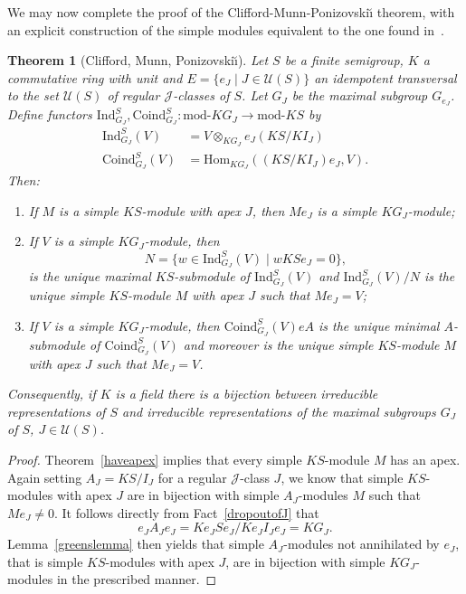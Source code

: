 \documentclass[reqno,11pt]{amsart}
\def\module#1{\mathrm{mod}\text{-}#1}
\def\J{\mathrel{{\mathscr J}}} %
\def\to{\rightarrow}
\def\Thmname{Theorem}
\newtheorem{Thm}{\Thmname}%
\numberwithin{equation}{section}
\begin{document}
We may now complete the proof of the Clifford-Munn-Ponizovski{\u\i} theorem,
with an explicit construction of the simple modules equivalent to the one
found in~\cite{RhodesZalc,LallePet}.

\begin{Thm}[Clifford, Munn, Ponizovski{\u\i}]
Let $S$ be a finite semigroup, $K$ a commutative ring with unit
and $E=\{e_J\mid
J\in \mathscr U(S)\}$ an idempotent transversal to the set $\mathscr
U(S)$ of regular
$\J$-classes of $S$.  Let $G_J$ be the maximal subgroup $G_{e_J}$.
Define functors $\mathrm{Ind}_{G_J}^S,\mathrm{Coind}_{G_J}^S:\module KG_J\to \module KS$ by
\begin{align*}
\mathrm{Ind}_{G_J}^S(V)&= V\otimes_{KG_J}e_J(KS/KI_J)\\
\mathrm{Coind}_{G_J}^S(V)&= \mathrm{Hom}_{KG_J}((KS/KI_J)e_J,V).
\end{align*}
Then:
\begin{enumerate}
\item If $M$ is a simple $KS$-module with apex $J$, then $Me_J$ is a
  simple $KG_J$-module;
\item If $V$ is a simple $KG_J$-module, then \[N = \{w\in
  \mathrm{Ind}_{G_J}^S(V)\mid wKSe_J=0\},\] is the unique maximal
  $KS$-submodule of $\mathrm{Ind}_{G_J}^S(V)$ and
  $\mathrm{Ind}_{G_J}^S(V)/N$ is the unique simple $KS$-module $M$
with apex $J$ such that $Me_J=V$;
\item If $V$ is a simple $KG_J$-module, then
  $\mathrm{Coind}_{G_J}^S(V)eA$ is the unique minimal $A$-submodule of
  $\mathrm{Coind}_{G_J}^S(V)$ and moreover is the unique simple
  $KS$-module $M$ 
with apex $J$ such that $Me_J=V$.
\end{enumerate}
Consequently, if $K$ is a field there is a bijection between
irreducible representations
of $S$ and irreducible representations of the maximal subgroups $G_J$ of $S$,
$J\in \mathscr U(S)$.
\end{Thm}
\begin{proof}
Theorem~\ref{haveapex} implies that every simple $KS$-module $M$ has an
apex. Again setting $A_J=KS/I_J$ for a regular $\J$-class $J$, we know
that simple $KS$-modules with apex $J$ are in bijection with simple
$A_J$-modules $M$ such that $Me_J\neq 0$. It follows directly from
Fact~\ref{dropoutofJ} that \[e_JA_Je_J=Ke_JSe_J/Ke_JI_Je_J=KG_J.\]
Lemma~\ref{greenslemma} then yields that simple $A_J$-modules not
annihilated by $e_J$, that is simple $KS$-modules with apex $J$, are
in bijection with simple $KG_J$-modules in the prescribed manner.
\end{proof}
\end{document}
